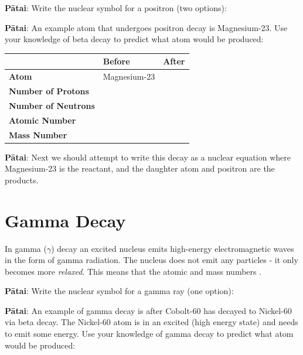 \documentclass[12pt]{report}
\makeatletter
\DeclareRobustCommand{\fillinunderline}[1]{%
\ifthenelse{\boolean{@answer}}{\textcolor{red}{\underbar{~~~ #1 ~~~}}}{\textcolor{gray}{\underbar{\phantom{~~~ #1 ~~~}}}}%
}
\makeatother
\begin{document}
{\noindent\textbf{Pātai}: Write the nuclear symbol for a positron (two options):
\vspace{1.5cm}

\noindent\textbf{Pātai}: An example atom that undergoes positron decay is Magnesium-23. Use your knowledge of beta decay to predict what atom would be produced:\vspace{1.5cm}

\begin{table}[ht]
\centering
\begin{tabular}{|l|p{3cm}|p{3cm}|}
\hline
                            & \textbf{Before} & \textbf{After} \\ \hline
\textbf{Atom}               & Magnesium-23    &                \\ \hline
\textbf{Number of Protons}  &                 &                \\ \hline
\textbf{Number of Neutrons} &                 &                \\ \hline
\textbf{Atomic Number}      &                 &                \\ \hline
\textbf{Mass Number}        &                 &                \\ \hline
\end{tabular}
\end{table}

\noindent\textbf{Pātai}: Next we should attempt to write this decay as a nuclear equation where Magnesium-23 is the reactant, and the daughter atom and positron are the products.
\vspace{1cm}

\section{Gamma Decay}
In gamma ($\gamma$) decay an excited nucleus emits high-energy electromagnetic waves in the form of gamma radiation. The nucleus does not emit any particles - it only becomes more \textit{relaxed}. This means that the atomic and mass numbers \fillinunderline{stay the same}.

\noindent\textbf{Pātai}: Write the nuclear symbol for a gamma ray (one option):
\vspace{0.5cm}

\noindent\textbf{Pātai}: An example of gamma decay is after Cobolt-60 has decayed to Nickel-60 via beta decay. The Nickel-60 atom is in an excited (high energy state) and needs to emit some energy. Use your knowledge of gamma decay to predict what atom would be produced:

}
\end{document}
